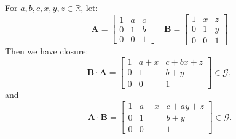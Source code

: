 \documentclass[11pt]{article}
\newcommand{\R}{\mathbb{R}}
\newcommand{\Gcal}{\mathcal{G}}  %
\newcommand{\mat}[1]{\mathbf{#1}}   %
\theoremstyle{definition}
\theoremstyle{plain}
\theoremstyle{remark}
\begin{document}
\begin{enumerate}
          For $a, b, c, x, y, z \in \R$, let:
          \[
              \mat{A} =
              \begin{bmatrix}
                  1 & a & c \\
                  0 & 1 & b \\
                  0 & 0 & 1
              \end{bmatrix}
              \quad
              \mat{B} =
              \begin{bmatrix}
                  1 & x & z \\
                  0 & 1 & y \\
                  0 & 0 & 1
              \end{bmatrix}
          \]
          Then we have closure:
          \[
              \mat{B} \cdot \mat{A} =
              \begin{bmatrix}
                  1 & a + x & c + bx + z \\
                  0 & 1     & b + y      \\
                  0 & 0     & 1
              \end{bmatrix}
              \in \Gcal,
          \]
          and
          \[
              \mat{A} \cdot \mat{B} =
              \begin{bmatrix}
                  1 & a + x & c + ay + z \\
                  0 & 1     & b + y      \\
                  0 & 0     & 1
              \end{bmatrix}
              \in \Gcal.
          \]


\end{enumerate}
\end{document}

